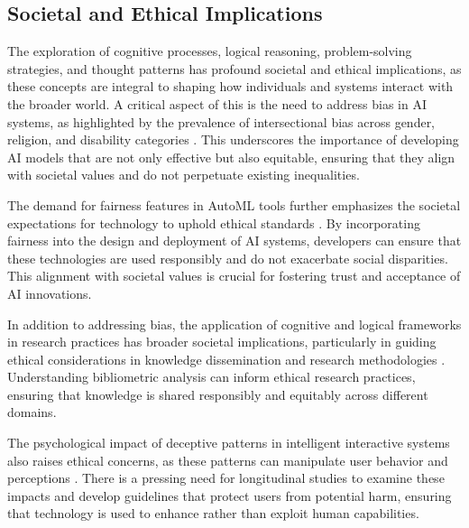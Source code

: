 \subsection{Societal and Ethical Implications} \label{subsec:Societal and Ethical Implications}



The exploration of cognitive processes, logical reasoning, problem-solving strategies, and thought patterns has profound societal and ethical implications, as these concepts are integral to shaping how individuals and systems interact with the broader world. A critical aspect of this is the need to address bias in AI systems, as highlighted by the prevalence of intersectional bias across gender, religion, and disability categories \cite{magee2021intersectionalbiascausallanguage}. This underscores the importance of developing AI models that are not only effective but also equitable, ensuring that they align with societal values and do not perpetuate existing inequalities.



The demand for fairness features in AutoML tools further emphasizes the societal expectations for technology to uphold ethical standards \cite{narayanan2023democratizecareneedfairness}. By incorporating fairness into the design and deployment of AI systems, developers can ensure that these technologies are used responsibly and do not exacerbate social disparities. This alignment with societal values is crucial for fostering trust and acceptance of AI innovations.



In addition to addressing bias, the application of cognitive and logical frameworks in research practices has broader societal implications, particularly in guiding ethical considerations in knowledge dissemination and research methodologies \cite{Contentsli1}. Understanding bibliometric analysis can inform ethical research practices, ensuring that knowledge is shared responsibly and equitably across different domains.



The psychological impact of deceptive patterns in intelligent interactive systems also raises ethical concerns, as these patterns can manipulate user behavior and perceptions \cite{benharrak2024deceptivepatternsintelligentinteractive}. There is a pressing need for longitudinal studies to examine these impacts and develop guidelines that protect users from potential harm, ensuring that technology is used to enhance rather than exploit human capabilities.



